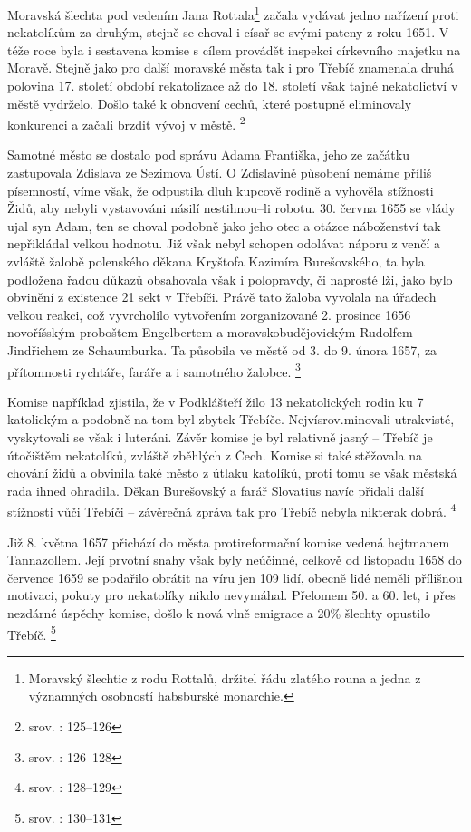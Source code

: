 \documentclass[a4paper,oneside,12p]{report}
\begin{document}
Moravská šlechta pod vedením Jana Rottala\footnote{Moravský šlechtic z rodu Rottalů, držitel řádu zlatého rouna a jedna z významných osobností habsburské monarchie.} začala vydávat jedno nařízení proti nekatolíkům za druhým, stejně se choval i císař se svými pateny z roku 1651.
V téže roce byla i sestavena komise s cílem provádět inspekci církevního majetku na Moravě.
Stejně jako pro další moravské města tak i pro Třebíč znamenala druhá polovina 17. století období rekatolizace až do 18. století však tajné nekatolictví v městě vydrželo.
Došlo také k obnovení cechů, které postupně eliminovaly konkurenci a začali brzdit vývoj v městě. \footnote{srov. \cite{Uhlir1978}: 125--126}

Samotné město se dostalo pod správu Adama Františka, jeho ze začátku zastupovala Zdislava ze Sezimova Ústí.
O Zdislavině působení nemáme příliš písemností, víme však, že odpustila dluh kupcově rodině a vyhověla stížnosti Židů, aby nebyli vystavováni násilí nestihnou--li robotu.
30. června 1655 se vlády ujal syn Adam, ten se choval podobně jako jeho otec a otázce náboženství tak nepřikládal velkou hodnotu.
Již však nebyl schopen odolávat náporu z venčí a zvláště žalobě polenského děkana Kryštofa Kazimíra Burešovského, ta byla podložena řadou důkazů obsahovala však i polopravdy, či naprosté lži, jako bylo obvinění z existence 21 sekt v Třebíči.
Právě tato žaloba vyvolala na úřadech velkou reakci, což vyvrcholilo vytvořením  zorganizované 2. prosince 1656 novoříšským proboštem Engelbertem a moravskobudějovickým Rudolfem Jindřichem ze Schaumburka.
Ta působila ve městě od 3. do 9. února 1657, za přítomnosti rychtáře, faráře a i samotného žalobce. \footnote{srov. \cite{Uhlir1978}: 126--128}

Komise například zjistila, že v Podklášteří žilo 13 nekatolických rodin ku 7 katolickým a podobně na tom byl zbytek Třebíče.
Nejvísrov.minovali utrakvisté, vyskytovali se však i luteráni.
Závěr komise je byl relativně jasný -- Třebíč je útočištěm nekatolíků, zvláště zběhlých z Čech.
Komise si také stěžovala na chování židů a obvinila také město z útlaku katolíků, proti tomu se však městská rada ihned ohradila.
Děkan Burešovský a farář Slovatius navíc přidali další stížnosti vůči Třebíči -- závěrečná zpráva tak pro Třebíč nebyla nikterak dobrá.  \footnote{srov. \cite{Uhlir1978}: 128--129}

Již 8. května 1657 přichází do města protireformační komise vedená hejtmanem Tannazollem.
Její prvotní snahy však byly neúčinné, celkově od listopadu 1658 do července 1659 se podařilo obrátit na  víru jen 109 lidí, obecně lidé neměli přílišnou motivaci, pokuty pro nekatolíky nikdo nevymáhal.
Přelomem 50. a 60. let, i přes nezdárné úspěchy komise, došlo k nová vlně emigrace a 20\% šlechty opustilo Třebíč. \footnote{srov. \cite{Uhlir1978}: 130--131}
\end{document}
